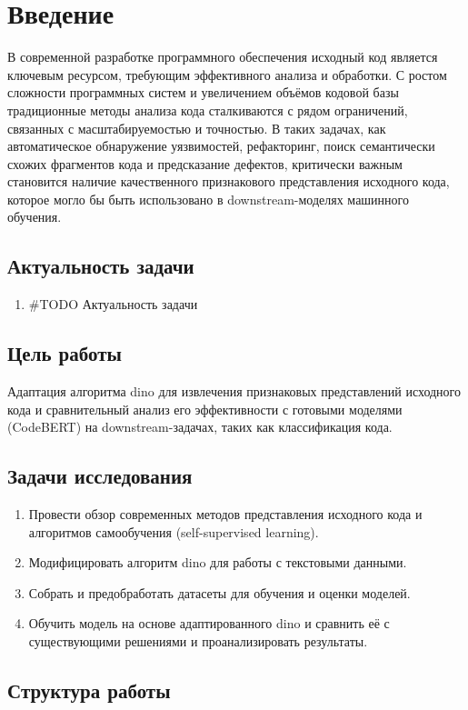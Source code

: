 \documentclass[../document.tex]{subfiles}
\begin{document}
    \section*{Введение}
    \par В современной разработке программного обеспечения исходный код является ключевым ресурсом, требующим эффективного анализа и обработки. С ростом сложности программных систем и увеличением объёмов кодовой базы традиционные методы анализа кода сталкиваются с рядом ограничений, связанных с масштабируемостью и точностью. В таких задачах, как автоматическое обнаружение уязвимостей, рефакторинг, поиск семантически схожих фрагментов кода и предсказание дефектов, критически важным становится наличие качественного признакового представления исходного кода, которое могло бы быть использовано в downstream-моделях машинного обучения.
    \subsection*{Актуальность задачи}
    \begin{enumerate}
        \item #TODO Актуальность задачи
    \end{enumerate}
    \subsection*{Цель работы}
    \par Адаптация алгоритма \gls{dino} для извлечения признаковых представлений исходного кода и сравнительный анализ его эффективности с готовыми моделями (CodeBERT) на downstream-задачах, таких как классификация кода.
    \subsection*{Задачи исследования}
    \begin{enumerate}
        \item Провести обзор современных методов представления исходного кода и алгоритмов самообучения (self-supervised learning).
        \item Модифицировать алгоритм \gls{dino} для работы с текстовыми данными.
        \item Собрать и предобработать датасеты для обучения и оценки моделей.
        \item Обучить модель на основе адаптированного \gls{dino} и сравнить её с существующими решениями и проанализировать результаты.
    \end{enumerate}
    \subsection*{Структура работы}
\end{document}
